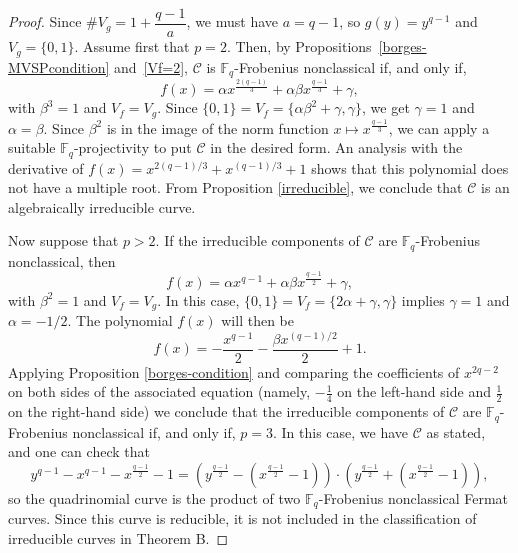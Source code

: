 \documentclass[preprint,12pt]{elsarticle}
\begin{document}
\begin{proof}
Since $\#V_g = 1 + \dfrac{q - 1}{a}$, we must have $a = q - 1$, so $g(y) = y^{q - 1}$ and $V_g = \{0, 1\}$. Assume first that $p = 2$. Then, by Propositions~\ref{borges-MVSPcondition} and~\ref{Vf=2}, $\mathcal{C}$ is $\mathbb{F}_q$-Frobenius nonclassical if, and only if,
$$
f(x) = \alpha x^{\frac{2(q - 1)}{3}} + \alpha \beta x^{\frac{q - 1}{3}} + \gamma,
$$
with $\beta^3 = 1$ and $V_f = V_g$. Since $\{0,1\} = V_f = \{\alpha \beta^2 + \gamma, \gamma\}$, we get $\gamma = 1$ and $\alpha = \beta$. Since $\beta^2$ is in the image of the norm function $x \mapsto x^{\frac{q-1}{3}}$, we can apply a suitable $\mathbb{F}_q$-projectivity to put $\mathcal{C}$ in the desired form. An analysis with the derivative of $f(x) = x^{2(q-1)/3} + x^{(q-1)/3} + 1$ shows that this polynomial does not have a multiple root. From Proposition \ref{irreducible}, we conclude that $\mathcal{C}$ is an algebraically irreducible curve.

Now suppose that $p > 2$. If the irreducible components of $\mathcal{C}$ are $\mathbb{F}_q$-Frobenius nonclassical, then
$$
f(x) = \alpha x^{q - 1} + \alpha \beta x^{\frac{q - 1}{2}} + \gamma,
$$
with $\beta^2 = 1$ and $V_f = V_g$. In this case, $\{0,1\} = V_f = \{2\alpha + \gamma, \gamma\}$ implies $\gamma = 1$ and $\alpha = -1/2$. The polynomial $f(x)$ will then be
$$f(x) = -\frac{x^{q - 1}}{2} - \frac{\beta x^{(q - 1)/2}}{2} + 1.$$
Applying Proposition \ref{borges-condition} and comparing the coefficients of $x^{2q - 2}$ on both sides of the associated equation (namely, $-\frac{1}{4}$ on the left-hand side and $\frac{1}{2}$ on the right-hand side) we conclude that the irreducible components of $\mathcal{C}$ are $\mathbb{F}_q$-Frobenius nonclassical if, and only if, $p = 3$. In this case, we have $\mathcal{C}$ as stated, and one can check that 
$$y^{q-1} - x^{q-1} - x^{\frac{q-1}{2}} - 1 = \left(y^{\frac{q-1}{2}}-(x^{\frac{q-1}{2}}-1) \right) \cdot \left(y^{\frac{q-1}{2}}+(x^{\frac{q-1}{2}}-1) \right),$$
so the quadrinomial curve is the product of two $\mathbb{F}_q$-Frobenius nonclassical Fermat curves. Since this curve is reducible, it is not included in the classification of irreducible curves in Theorem B.

\end{proof}
\end{document}
